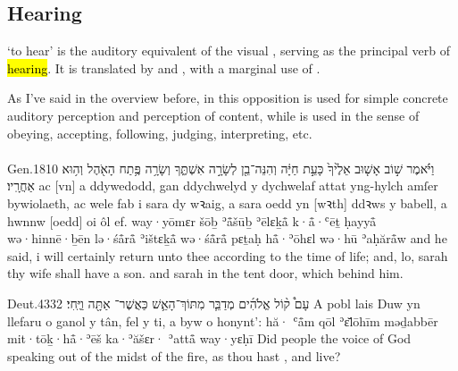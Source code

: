 \subsection{Hearing}


\begin{paper}
	{\click}  ‘to hear’ is the auditory equivalent of the visual , serving as the principal verb of \hl{hearing}. It is translated by  and , with a marginal use of .

	As I’ve said in the overview before,  in this opposition is used for simple concrete auditory perception and perception of content, while  is used in the sense of obeying, accepting, following, judging, interpreting, etc.
\end{paper}



\paragraph{}


\begin{example}{Gen.}{18}{10}{}{}
	\quoling
	{וַיֹּ֗אמֶר שׁ֣וֹב אָשׁ֤וּב אֵלֶ֙יךָ֙ כָּעֵ֣ת חַיָּ֔ה וְהִנֵּה־בֵ֖ן לְשָׂרָ֣ה אִשְׁתֶּ֑ךָ וְשָׂרָ֥ה  פֶּ֥תַח הָאֹ֖הֶל וְה֥וּא אַחֲרָֽיו׃}
	{ac [vn] a ddywedodd, gan ddychwelyd y dychwelaf attat yng-hylch amſer bywiolaeth, ac wele fab i sara dy wꝛaig, a sara oedd yn  [wꝛth] ddꝛws y babell, a hwnnw [oedd] oi ôl ef.}
	{way·yōmɛr šōḇ ʾå̄šūḇ ʾēlɛḵå̄ k·å̄·ʿēṯ ḥayyå̄ wə·hinnē·ḇēn lə·śå̄rå̄ ʾištɛḵå̄ wə·śå̄rå̄  pɛṯaḥ hå̄·ʾōhɛl wə·hū ʾaḥărå̄w}
	{and he said, i will certainly return unto thee according to the time of life; and, lo, sarah thy wife shall have a son. and sarah   in the tent door, which  behind him.}
\end{example}

\begin{example}{Deut.}{4}{33}{2}{}
	\quoling
	{ עָם֩ ק֨וֹל אֱלֹהִ֜ים מְדַבֵּ֧ר מִתּוֹךְ־הָאֵ֛שׁ כַּאֲשֶׁר־ אַתָּ֖ה וַיֶּֽחִי׃}
	{A  pobl lais Duw yn llefaru o ganol y tân, fel y  ti, a byw o honynt’:}
	{hă· ʿå̄m qōl ʾɛ̆lōhīm məḏabbēr mit·tōḵ·hå̄·ʾēš ka·ʾăšɛr· ʾattå̄ way·yɛḥī}
	{Did  people  the voice of God speaking out of the midst of the fire, as thou hast , and live?}
\end{example}



